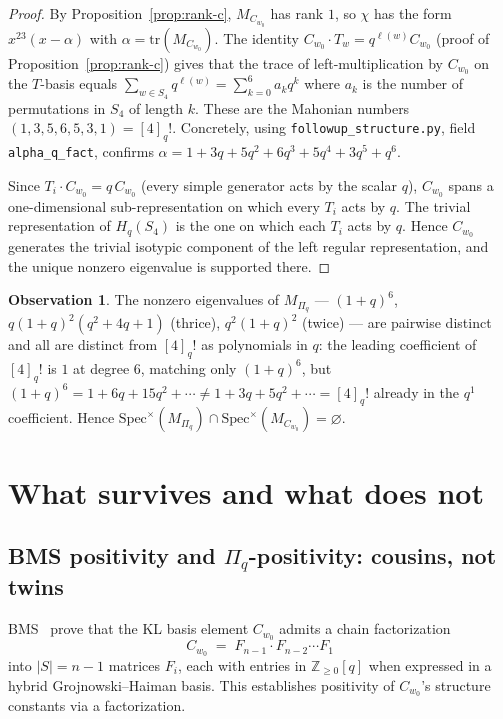 \documentclass[11pt]{article}
\theoremstyle{definition}
\newtheorem{observation}[theorem]{Observation}
\begin{document}
\begin{proof}
By Proposition~\ref{prop:rank-c}, $M_{C_{w_0}}$ has rank $1$, so $\chi$ has
the form $x^{23}(x-\alpha)$ with $\alpha = \mathrm{tr}(M_{C_{w_0}})$. The
identity $C_{w_0}\cdot T_w = q^{\ell(w)} C_{w_0}$ (proof of
Proposition~\ref{prop:rank-c}) gives that the trace of left-multiplication
by $C_{w_0}$ on the $T$-basis equals $\sum_{w\in S_4} q^{\ell(w)} =
\sum_{k=0}^{6} a_k q^k$ where $a_k$ is the number of permutations in $S_4$
of length $k$. These are the Mahonian numbers
$(1,3,5,6,5,3,1) = [4]_q!$. Concretely, using
\texttt{followup\_structure.py}, field \texttt{alpha\_q\_fact}, confirms
$\alpha = 1 + 3q + 5q^2 + 6q^3 + 5q^4 + 3q^5 + q^6$.

Since $T_i \cdot C_{w_0} = q\, C_{w_0}$ (every simple generator acts by
the scalar $q$), $C_{w_0}$ spans a one-dimensional sub-representation on
which every $T_i$ acts by $q$. The trivial representation of $H_q(S_4)$ is
the one on which each $T_i$ acts by $q$. Hence $C_{w_0}$ generates the
trivial isotypic component of the left regular representation, and the
unique nonzero eigenvalue is supported there.
\end{proof}

\begin{observation}\label{obs:disjoint-spectra}
The nonzero eigenvalues of $M_{\Pi_q}$ --- $(1+q)^6$, $q(1+q)^2(q^2+4q+1)$
(thrice), $q^2(1+q)^2$ (twice) --- are pairwise distinct and all are
distinct from $[4]_q!$ as polynomials in $q$: the leading coefficient of
$[4]_q!$ is $1$ at degree $6$, matching only $(1+q)^6$, but
$(1+q)^6 = 1+6q+15q^2+\cdots \ne 1+3q+5q^2+\cdots = [4]_q!$ already in the
$q^1$ coefficient. Hence $\mathrm{Spec}^\times(M_{\Pi_q}) \cap
\mathrm{Spec}^\times(M_{C_{w_0}}) = \varnothing$.
\end{observation}

\section{What survives and what does not}\label{sec:survives}

\subsection{BMS positivity and $\Pi_q$-positivity: cousins, not twins}

BMS~\cite{BMS} prove that the KL basis element $C_{w_0}$ admits a chain
factorization
\[
C_{w_0} \;=\; F_{n-1} \cdot F_{n-2} \cdots F_1
\]
into $|S| = n-1$ matrices $F_i$, each with entries in
$\mathbb{Z}_{\geq 0}[q]$ when expressed in a hybrid Grojnowski--Haiman
basis. This establishes positivity of $C_{w_0}$'s structure constants via a
factorization.
\end{document}
